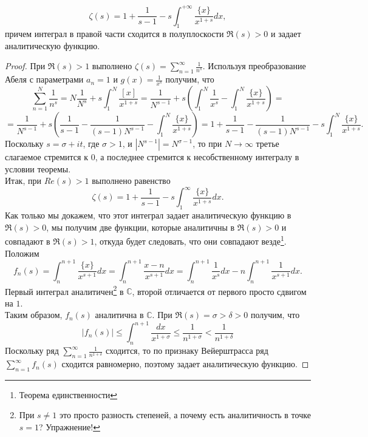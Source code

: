 \begin{theorem} \label{l3_thm5}
	$$\zeta(s) = 1 + \frac{1}{s - 1} - s \int_{1}^{+\infty} \frac{\{x\}}{x^{1 + s}} dx,$$
	причем интеграл в правой части сходится в полуплоскости $\Re(s) > 0$ и задает аналитическую функцию.
\end{theorem}
\begin{proof}
	При $\Re(s) > 1$ выполнено $\displaystyle \zeta(s) = \sum_{n = 1}^{\infty} \frac{1}{n^s}$. Используя преобразование Абеля с параметрами $a_n = 1$ и $\displaystyle g(x) = \frac{1}{x^s}$ получим, что 
	$$\sum_{n = 1}^{N} \frac{1}{n^s} = N \frac{1}{N^s} + s \int_{1}^{N}\frac{[x]}{x^{1 + s}} = \frac{1}{N^{s - 1}} + s \left( \int_{1}^{N}\frac{1}{x^s} - \int_{1}^{N}\frac{\{x\}}{x^{1 + s}}\right) = $$
	$$ = \frac{1}{N^{s - 1}} + s \left( \frac{1}{s - 1} - \frac{1}{(s - 1)N^{s - 1}} - \int_{1}^{N}\frac{\{x\}}{x^{1 + s}}\right) = 1 + \frac{1}{s - 1} - \frac{1}{(s - 1)N^{s - 1}} - s \int_{1}^{N}\frac{\{x\}}{x^{1 + s}}.$$
	Поскольку $s = \sigma + i t$, где $\sigma > 1$, и $|N^{s - 1}| = N^{\sigma - 1}$, то при $N \rightarrow \infty $ третье слагаемое стремится к 0, а последнее стремится к несобственному интегралу в условии теоремы.\\
	Итак, при $Re(s) > 1$ выполнено равенство
	$$\zeta(s) = 1 + \frac{1}{s - 1} - s \int_{1}^{\infty} \frac{\{x\}}{x^{1 + s}} dx.$$
	Как только мы докажем, что этот интеграл задает аналитическую функцию в $\Re(s) > 0$, мы получим 	две функции, которые аналитичны в $\Re(s) > 0$ и совпадают  в $\Re(s) > 1$, откуда будет следовать, что они совпадают везде\footnote{Теорема единственности}.\\
	Положим 
	$$f_n(s) = \int_{n}^{n + 1} \frac{\{x\}}{x^{s + 1}} dx = \int_{n}^{n + 1} \frac{x - n}{x^{s + 1}} dx = \int_{n}^{n + 1} \frac{1}{x^{s}} dx - n \int_{n}^{n + 1} \frac{1}{x^{s + 1}} dx.$$ 
	Первый интеграл аналитичен\footnote{При $s \ne 1$ это просто разность степеней, а почему есть аналитичность в точке $s = 1$? Упражнение!} в $\mathbb{C}$, второй отличается от первого просто сдвигом на $1$.\\
	Таким образом, $f_n(s)$ аналитична в $\mathbb{C}$. При $\Re(s) = \sigma > \delta > 0$ получим, что 
	$$|f_n(s)| \leq \int_{n}^{n + 1} \frac{dx}{x^{1 + \sigma}} \leq \frac{1}{n^{1 + \sigma}} < \frac{1}{n^{1 + \delta}}$$
	Поскольку ряд $\displaystyle \sum_{n = 1}^{\infty} \frac{1}{n^{1 + \delta}}$ сходится, то по признаку Вейерштрасса ряд $\displaystyle \sum_{n = 1}^{\infty} f_n(s)$ сходится равномерно, поэтому задает аналитическую функцию.
\end{proof}

